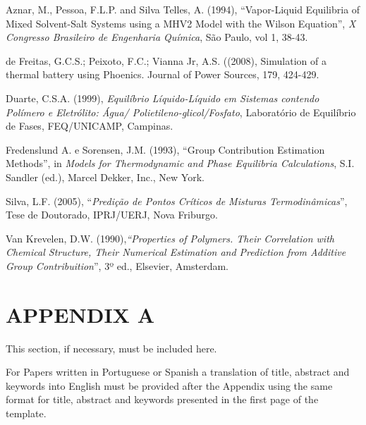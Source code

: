 \documentclass[12pt,fleqn]{article}
\begin{document}
\begin{thebibliography}{99}
\fontsize{11}{0}\selectfont
{}
Aznar, M., Pessoa, F.L.P. and Silva Telles, A. (1994), ``Vapor-Liquid Equilibria of Mixed Solvent-Salt Systems using a MHV2 Model with the Wilson Equation'', {\em X Congresso Brasileiro de Engenharia Química}, São Paulo, vol 1, 38-43.

de Freitas, G.C.S.; Peixoto, F.C.; Vianna Jr, A.S. ((2008), Simulation of a thermal battery using Phoenics. Journal of Power Sources, 179, 424-429. 

Duarte, C.S.A. (1999), {\em Equilíbrio Líquido-Líquido em Sistemas contendo Polímero e Eletrólito: Água/ Polietileno-glicol/Fosfato}, Laboratório de Equilíbrio de Fases, FEQ/UNICAMP, Campinas.

Fredenslund A. e Sorensen, J.M. (1993), ``Group Contribution Estimation Methods'', in {\em  Models for Thermodynamic and Phase Equilibria Calculations}, S.I. Sandler (ed.), Marcel Dekker, Inc., New York.

Silva, L.F. (2005), ``{\em Predição de Pontos Críticos de Misturas Termodinâmicas}'', Tese de Doutorado, IPRJ/UERJ, Nova Friburgo.

Van Krevelen, D.W. (1990),{\em ``Properties of Polymers. Their Correlation with Chemical Structure, Their Numerical Estimation and Prediction from Additive Group Contribuition}'', 3º ed., Elsevier, Amsterdam.
\end{thebibliography}
\vspace*{-0.1cm}
\section*{APPENDIX A}
This section, if necessary, must be included here.

\vspace{0.5cm} %

For Papers written in Portuguese or Spanish a translation of title, abstract and keywords into English must be provided after the Appendix using the same format for title, abstract and keywords presented in the first page of the template.

\end{document}
